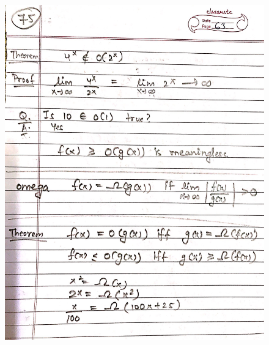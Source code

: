 \begin{figure}[H]
    \centering
    \includegraphics[scale=0.25]{"./MIT 6.042J/MIT_6042J_075"}
\end{figure}
\newpage
